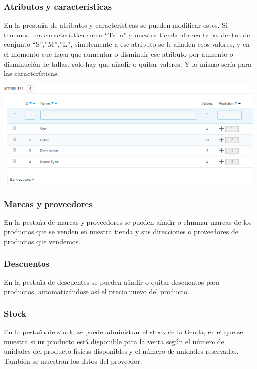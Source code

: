 \documentclass{article}
\begin{document}
\subsubsection{Atributos y características}

En la prestaña de atributos y características se pueden modificar estos. Si tenemos una característica como “Talla” y nuestra tienda abarca tallas dentro del conjunto {“S”,”M”,”L”}, simplemente a ese atributo se le añaden esos valores, y en el momento que haya que aumentar o disminuir  ese atributo por aumento o disminución de tallas, solo hay que añadir o quitar valores. Y lo mismo sería para las características.

\begin{center}
\includegraphics[scale=0.4]{images/atributos.png}
\end{center}

\subsubsection{Marcas y proveedores}

En la pestaña de marcas y proveedores  se pueden añadir o eliminar marcas de los productos que se venden en nuestra tienda y sus direcciones  o proveedores de productos que vendemos. 

\subsubsection{Descuentos}

En la pestaña de descuentos se pueden añadir o quitar descuentos para productos, automatizándose así el precio nuevo del producto.

\subsubsection{Stock}

En la pestaña de stock, se puede administrar el stock de la tienda, en el que se muestra si un producto está disponible para la venta según el número de unidades del producto físicas disponibles y el número de unidades reservadas. También se muestran los datos del proveedor.
\end{document}
